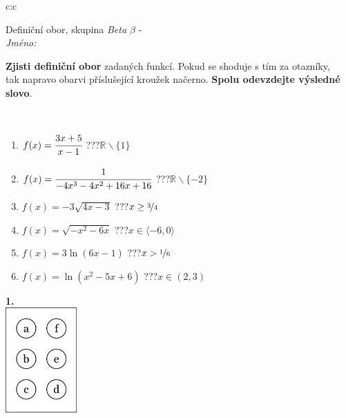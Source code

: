 \documentclass[10pt]{report}
\begin{document}
\begin{tabular}{c:c}
\begin{minipage}[c][104.5mm][t]{0.5\linewidth}
\begin{center}
\vspace{7mm}
{\huge Definiční obor, skupina \textit{Beta $\beta$} -}\\[5mm]
\textit{Jméno:}\phantom{xxxxxxxxxxxxxxxxxxxxxxxxxxxxxxxxxxxxxxxxxxxxxxxxxxxxxxxxxxxxxxxxx}\\[5mm]
\begin{minipage}{0.95\linewidth}
\begin{center}
\textbf{Zjisti definiční obor} zadaných funkcí. Pokud se shoduje s tím za otazníky,\\tak napravo obarvi příslušející kroužek načerno. \textbf{Spolu odevzdejte výsledné slovo}.
\end{center}
\end{minipage}
\\[1mm]
\begin{minipage}{0.79\linewidth}
\begin{center}
\begin{varwidth}{\linewidth}
\begin{enumerate}
\normalsizerrr
\item $f(x)=\cfrac{3x+5}{x-1}$\quad \dotfill\; ???\;\dotfill \quad $\mathbb{R}\smallsetminus\{1\}$
\item $f(x)=\cfrac{1}{-4x^3-4x^2+16x+16}$\quad \dotfill\; ???\;\dotfill \quad $\mathbb{R}\smallsetminus\{-2\}$
\item $f(x)=-3\sqrt{4x-3}$\quad \dotfill\; ???\;\dotfill \quad $x\geq\nicefrac{3}{4}$
\item $f(x)=\sqrt{-x^2-6x}$\quad \dotfill\; ???\;\dotfill \quad $x\in\langle-6 , 0\rangle$
\item $f(x)=3\ln{(6x-1)}$\quad \dotfill\; ???\;\dotfill \quad $x>\nicefrac{1}{6}$
\item $f(x)=\ln{(x^2-5x+6)}$\quad \dotfill\; ???\;\dotfill \quad $x\in(2 , 3)$
\end{enumerate}
\end{varwidth}
\end{center}
\end{minipage}
\begin{minipage}{0.20\linewidth}
\begin{center}
{\Huge\bfseries 1.} \\[2mm]
\includegraphics[height=40mm]{../images/braille.png}

\end{center}
\end{minipage}
\end{center}
\end{minipage}
\end{tabular}
\end{document}
